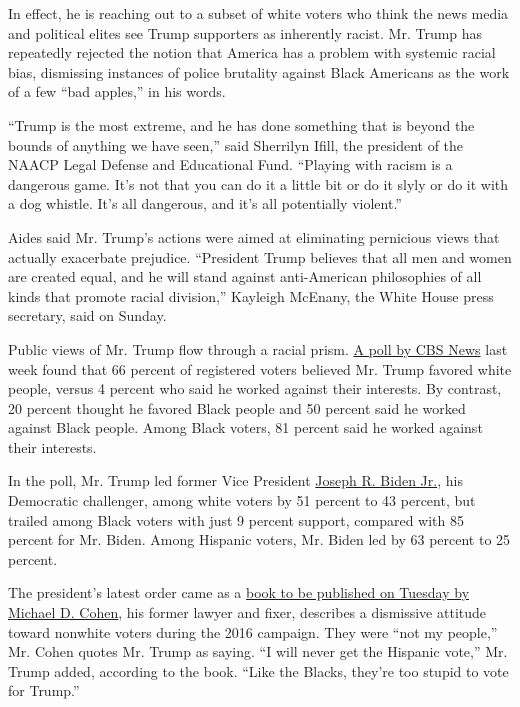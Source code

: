 In effect, he is reaching out to a subset of white voters who think the
news media and political elites see Trump supporters as inherently
racist. Mr. Trump has repeatedly rejected the notion that America has a
problem with systemic racial bias, dismissing instances of police
brutality against Black Americans as the work of a few ``bad apples,''
in his words.

``Trump is the most extreme, and he has done something that is beyond
the bounds of anything we have seen,'' said Sherrilyn Ifill, the
president of the NAACP Legal Defense and Educational Fund. ``Playing
with racism is a dangerous game. It's not that you can do it a little
bit or do it slyly or do it with a dog whistle. It's all dangerous, and
it's all potentially violent.''

Aides said Mr. Trump's actions were aimed at eliminating ﻿pernicious
views that actually exacerbate prejudice. ``President Trump believes
that all men and women are created equal, and he will stand against
anti-American philosophies of all kinds that promote racial division,''
Kayleigh McEnany, the White House press secretary, said on Sunday.

Public views of Mr. Trump flow through a racial prism.
\href{https://drive.google.com/file/d/1hmvwY-EJIMWKveUWPTdpx_-JL6VTqCcx/view}{A
poll by CBS News} last week found that 66 percent of registered voters
believed Mr. Trump favored white people, versus 4 percent who said he
worked against their interests. By contrast, 20 percent thought he
favored Black people and 50 percent said he worked against Black people.
Among Black voters, 81 percent said he worked against their interests.

In the poll, Mr. Trump led former Vice President
\href{https://www.nytimes3xbfgragh.onion/interactive/2020/us/elections/joe-biden.html}{Joseph
R. Biden Jr.}, his Democratic challenger, among white voters by 51
percent to 43 percent, but trailed among Black voters with just 9
percent support, compared with 85 percent for Mr. Biden. Among Hispanic
voters, Mr. Biden led by 63 percent to 25 percent.

The president's latest order came as a
\href{https://www.nytimes3xbfgragh.onion/2020/09/06/us/politics/cohen-book-trump.html}{book
to be published on Tuesday by Michael D. Cohen}, his former lawyer and
fixer, describes a dismissive attitude toward nonwhite voters during the
2016 campaign. They were ``not my people,'' Mr. Cohen quotes Mr. Trump
as saying. ``I will never get the Hispanic vote,'' Mr. Trump added,
according to the book. ``Like the Blacks, they're too stupid to vote for
Trump.''

